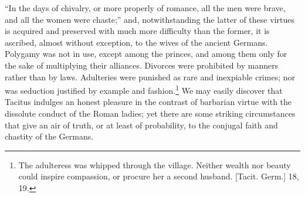 \texthebrew{“}In the days of chivalry, or more properly of romance, all the men were brave, and all the women were chaste;\texthebrew{}” and, notwithstanding the latter of these virtues is acquired and preserved with much more difficulty than the former, it is ascribed, almost without exception, to the wives of the ancient Germans. Polygamy was not in use, except among the princes, and among them only for the sake of multiplying their alliances. Divorces were prohibited by manners rather than by laws. Adulteries were punished as rare and inexpiable crimes; nor was seduction justified by example and fashion.\footnote{The adulteress was whipped through the village. Neither wealth nor beauty could inspire compassion, or procure her a second husband. [Tacit. Germ.] 18, 19.} We may easily discover that Tacitus indulges an honest pleasure in the contrast of barbarian virtue with the dissolute conduct of the Roman ladies; yet there are some striking circumstances that give an air of truth, or at least of probability, to the conjugal faith and chastity of the Germans.

